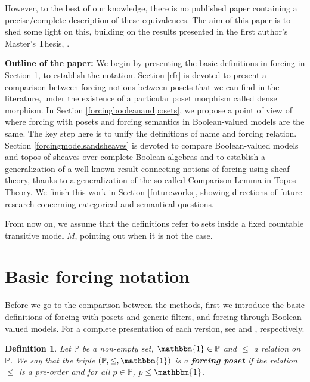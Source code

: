 \documentclass[10pt,longbibliography]{article}
\newtheorem{Def}[Theo]{Definition}
\newcommand{\One}{\mathbbm{1}}
\newcommand{\Po}{\mathbb{P}}
\begin{document}

However, to the best of our knowledge, there is no published paper containing a precise/complete description of these equivalences. The aim of this paper is to shed some light on this, building on the results 
presented in the first author's Master's Thesis, \cite{Smy24}.



{\bf Outline of the paper:} We begin by presenting the basic definitions in forcing in Section \ref{Forcingnotation}, to establish the notation. Section \ref{rfr} is devoted to present a comparison between forcing notions between posets that we can find in the literature, under the existence of a particular poset morphism called dense morphism. In Section \ref{forcingbooleanandposets}, we propose a point of view of where forcing with posets and forcing semantics in Boolean-valued models are the same. The key step here is to unify the definitions of name and forcing relation. Section \ref{forcingmodelsandsheaves} is devoted to compare  Boolean-valued models and topos of sheaves over complete Boolean algebras and to establish a generalization of a well-known result connecting notions of forcing using sheaf theory, thanks to a generalization of the so called Comparison Lemma in Topos Theory. We finish this work in Section \ref{futureworks}, showing directions of future research concerning categorical and semantical questions.





From now on, we assume that the definitions refer to sets inside a fixed countable transitive model $M$, pointing out when it is not the case.

\section{Basic forcing notation}\label{Forcingnotation}
Before we go to the comparison between the methods, first we introduce the basic definitions of forcing with posets and generic filters, and forcing through Boolean-valued models. For a complete presentation of each version, see \cite{Jech03} and \cite{Kunen11}, respectively. 

\begin{Def}\label{forcingposetdef}
	Let  $\Po$ be a non-empty set, $\One \in \Po$ and $\leq$ a relation on $\Po$. We say that the triple $(\Po, \leq, \One)$ is a \textbf{forcing poset} if the relation $\leq$ is a pre-order and for all $p \in \Po$, $p \leq \One$.
\end{Def}
\end{document}

